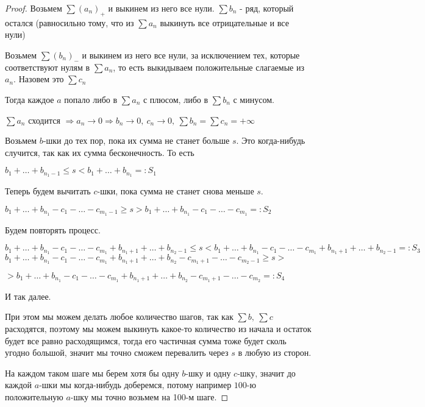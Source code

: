 \begin{proof}
    Возьмем $\sum(a_n)_+$ и выкинем из него все нули. $\sum b_n$ - ряд, который остался (равносильно тому, что из $\sum a_n$ выкинуть все отрицательные и все нули)

    Возьмем $\sum(b_n)_-$ и выкинем из него все нули, за исключением тех, которые соответствуют нулям в $\sum a_n$, то есть выкидываем положительные слагаемые из $a_n$. Назовем это $\sum c_n$

    Тогда каждое $a$ попало либо в $\sum a_n$ с плюсом, либо в $\sum b_n$ с минусом.

    $\sum a_n$ сходится $\Rightarrow a_n \to 0 \Rightarrow b_n \to 0,\ c_n \to 0, \ \sum b_n = \sum c_n = +\infty$

    Возьмем $b$-шки до тех пор, пока их сумма не станет больше $s$. Это когда-нибудь случится, так как их сумма бесконечность. То есть

    $b_1 + \ldots + b_{n_1 - 1} \leq s < b_1 + \ldots + b_{n_1} =: S_1$

    Теперь будем вычитать $c$-шки, пока сумма не станет снова меньше $s$.

    $b_1 + \ldots + b_{n_1} - c_1 - \ldots - c_{m_1 - 1} \geq s > b_1 + \ldots + b_{n_1} - c_1 - \ldots - c_{m_1} =: S_2$

    Будем повторять процесс.

    $b_1 + \ldots + b_{n_1} - c_1 - \ldots -  c_{m_1} + b_{n_1 + 1} + \ldots + b_{n_2-1} \leq s < b_1 + \ldots + b_{n_1} - c_1 - \ldots -  c_{m_1} + b_{n_1 + 1} + \ldots + b_{n_2-1} =: S_3$\\

    $b_1 + \ldots + b_{n_1} - c_1 - \ldots -  c_{m_1} + b_{n_1 + 1} + \ldots + b_{n_2} - c_{m_1+1} - \ldots - c_{m_2-1} \geq s >$

    $ > b_1 + \ldots + b_{n_1} - c_1 - \ldots -  c_{m_1} + b_{n_1 + 1} + \ldots + b_{n_2} - c_{m_1+1} - \ldots - c_{m_2} =: S_4$

    И так далее.

    При этом мы можем делать любое количество шагов, так как $\sum b,\ \sum c$ расходятся, поэтому мы можем
    выкинуть какое-то количество из начала и остаток будет все равно расходящимся, тогда его частичная сумма тоже будет сколь угодно большой,
    значит мы точно сможем перевалить через $s$ в любую из сторон.

    На каждом таком шаге мы берем хотя бы одну $b$-шку и одну $c$-шку, значит до каждой $a$-шки мы когда-нибудь доберемся, потому
    например $100$-ю положительную $a$-шку мы точно возьмем на 100-м шаге.


\end{proof}
